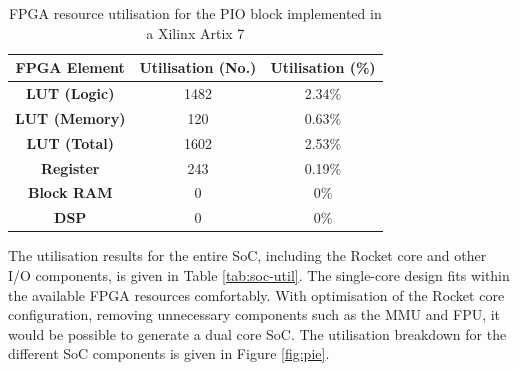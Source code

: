 \begin{table}[h!]
    \centering
    \begin{tabular}{|c|c|c|}
        \hline
        \textbf{FPGA Element} & \textbf{Utilisation (No.)} & \textbf{Utilisation  (\%)} \\
        \hline
        \textbf{LUT (Logic)}  & 1482                       & 2.34\%                     \\
        \hline
        \textbf{LUT (Memory)} & 120                        & 0.63\%                     \\
        \hline
        \textbf{LUT (Total)}  & 1602                       & 2.53\%                     \\
        \hline
        \textbf{Register}     & 243                        & 0.19\%                     \\
        \hline
        \textbf{Block RAM}    & 0                          & 0\%                        \\
        \hline
        \textbf{DSP}          & 0                          & 0\%                        \\
        \hline
    \end{tabular}
    \caption{FPGA resource utilisation for the PIO block implemented in a Xilinx Artix 7}
    \label{tab:pio-util}
\end{table}

The utilisation results for the entire SoC, including the Rocket core and other I/O components, is given in Table \ref{tab:soc-util}. The single-core design fits within the available FPGA resources comfortably. With optimisation of the Rocket core configuration, removing unnecessary components such as the MMU and FPU, it would be possible to generate a dual core SoC. The utilisation breakdown for the different SoC components is given in Figure \ref{fig:pie}.

